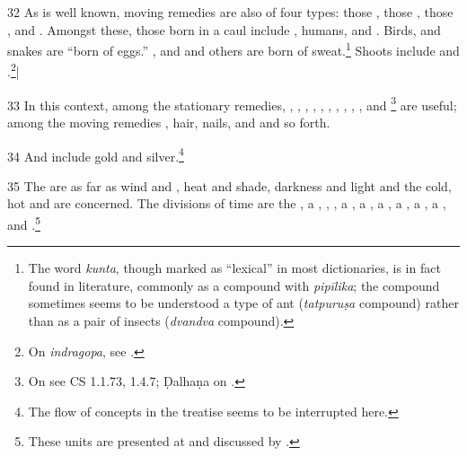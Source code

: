 \begin{translation}
    
    
    \item[32]  As is well known, moving remedies are also of four types: those
    , those ,
    those , and . Amongst
    these, those born in a caul include , humans, and
    .  Birds,  and
    snakes are “born of eggs.” , 
    and  and others are born of sweat.\footnote{The word
    \emph{kunta}, though marked as “lexical” in most dictionaries, is in fact found
    in literature, commonly as a compound with \emph{pipīlika}; the compound
    sometimes seems to be understood a type of ant (\emph{tatpuruṣa} compound)
    rather than as a pair of insects (\emph{dvandva} compound).}  Shoots include
     and .\footnote{On
    \emph{indragopa}, see \cite{lien-1978}.}|
    
    \item[33] In this context, among the stationary remedies, 
    , 
    , 
    , 
    ,
    ,
    ,
    ,
    ,
    ,
    , 
    and
    \footnote{On  see
    CS 1.1.73, 1.4.7; Ḍalhaṇa on .} 
    are useful; among the moving remedies 
    , hair, nails, and 
     and so forth. 
    
    \item[34] And  include gold and 
    silver.\footnote{The flow of concepts in the treatise seems to be interrupted here.}
    
    \item[35] The  are  
    as far as wind and , heat and shade, darkness and light
    and the cold, hot and  are concerned. 
    The divisions of time are the
    , a
    , 
    , 
    , a
    , a
    , a
    , a
    , a
    , a
    ,
    and
    .\footnote{These units are presented at 
     and discussed by \citet[\S\,59]{haya-2017}.}
    

\end{translation}
